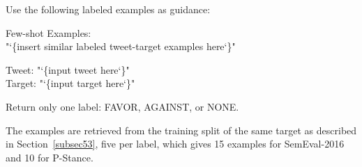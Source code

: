 \documentclass[pdflatex,sn-mathphys-num,iicol]{sn-jnl}%
\newcommand{\ttlbrace}{\char`\{}
\newcommand{\ttrbrace}{\char`\}}
\begin{document}
\begin{appendices}
\begin{tcolorbox}[colframe=snrule, colback=snbox, boxrule=0.6pt, arc=3pt, width=\linewidth, left=5pt, right=5pt, top=4pt, bottom=4pt]
	Use the following labeled examples as guidance:

	Few-shot Examples: \\
	"\ttlbrace insert similar labeled tweet-target examples here\ttrbrace"

	Tweet: "\ttlbrace input tweet here\ttrbrace" \\
	Target: "\ttlbrace input target here\ttrbrace"

	Return only one label: FAVOR, AGAINST, or NONE.
\end{tcolorbox}

The examples are retrieved from the training split of the same target as described in Section~\ref{subsec53}, five per label, which gives 15 examples for SemEval-2016 and 10 for P-Stance.

\end{appendices}

\end{document}
